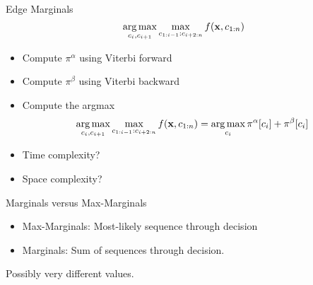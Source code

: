 \documentclass{beamer}
\def\Lattice{
    \matrix (network)
    [matrix of nodes,
    nodes in empty cells,
    ampersand replacement=\&,
    column sep={1cm},
    row sep={0.1cm},
    nodes={outer sep=0pt,circle,minimum size=0.5cm, minimum width=1.3cm,draw, rectangle} ]
    {
     O \& O \& O \& O \& O\\
     I-PER \& I-PER \& I-PER \& I-PER \& I-PER \\ 
     I-ORG \& I-ORG \& I-ORG \& I-ORG \& I-ORG \\ 
     I-LOC \& I-LOC \& I-LOC \& I-LOC \& I-LOC \\ 
     |[draw=none]| \\
     |[draw=none]| Mayor \& |[draw=none]| DeBlasio \& |[draw=none]| from \& |[draw=none]| New  \& |[draw=none]| York  \\  
};
}
\begin{document}

\begin{frame}{Edge Marginals}
  \[ \argmax_{c_i, c_{i+1}} \max_{c_{1:i-1}:c_{i+2:n}} f(\boldx, c_{1:n}) \] 
  \begin{itemize}
  \item Compute $\pi^{\alpha}$ using Viterbi forward
    \air 

  \item Compute $\pi^{\beta}$ using Viterbi backward 
    \air

  \item Compute the argmax
    \[ \argmax_{c_i, c_{i+1}} \max_{c_{1:i-1}:c_{i+2:n}} f(\boldx, c_{1:n}) = \argmax_{c_i} \pi^{\alpha}[c_i] + \pi^{\beta}[c_i] \] 
  \end{itemize}
  
  \begin{itemize}
  \item Time complexity?
    \air 
  \item Space complexity?
  \end{itemize}
\end{frame}



\begin{frame}{Marginals versus Max-Marginals}
  \begin{itemize}
  \item Max-Marginals: Most-likely sequence through decision
    \air 
  \item Marginals: Sum of sequences through decision.
  \end{itemize}
  
  Possibly very different values.
\end{frame}
\end{document}

